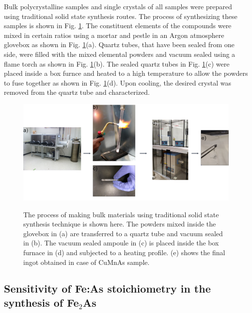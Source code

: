 \documentclass[10pt,doublespacing,edeposit]{uiucthesis2020}
\begin{document}
\begin{mainmatter}


Bulk polycrystalline samples and single crystals of all samples were prepared using traditional solid state synthesis routes. The process of synthesizing these samples is shown in Fig. \ref{fig:synthesis_procedure}. The constituent elements of the compounds were mixed in certain ratios using a mortar and pestle in an Argon atmosphere glovebox as shown in Fig. \ref{fig:synthesis_procedure}(a). Quartz tubes, that have been sealed from one side, were filled with the mixed elemental powders and vacuum sealed using a flame torch as shown in Fig. \ref{fig:synthesis_procedure}(b). The sealed quartz tubes in Fig. \ref{fig:synthesis_procedure}(c) were placed inside a box furnce and heated to a high temperature to allow the powders to fuse together as shown in Fig. \ref{fig:synthesis_procedure}(d). Upon cooling, the desired crystal was removed from the quartz tube and characterized.

\begin{figure}
\centering\includegraphics[width=\columnwidth]{figures/ch3/synthesis_procedure.png} \\
\caption{\label{fig:synthesis_procedure}
The process of making bulk materials using traditional solid state synthesis technique is shown here. The powders mixed inside the glovebox in (a) are transferred to a quartz tube and vacuum sealed in (b). The vacuum sealed ampoule in (c) is placed inside the box furnace in (d) and subjected to a heating profile. (e) shows the final ingot obtained in case of CuMnAs sample.
}
\end{figure}



\subsection{Sensitivity of Fe:As stoichiometry in the synthesis of Fe$_2$As}


\end{mainmatter}
\end{document}
